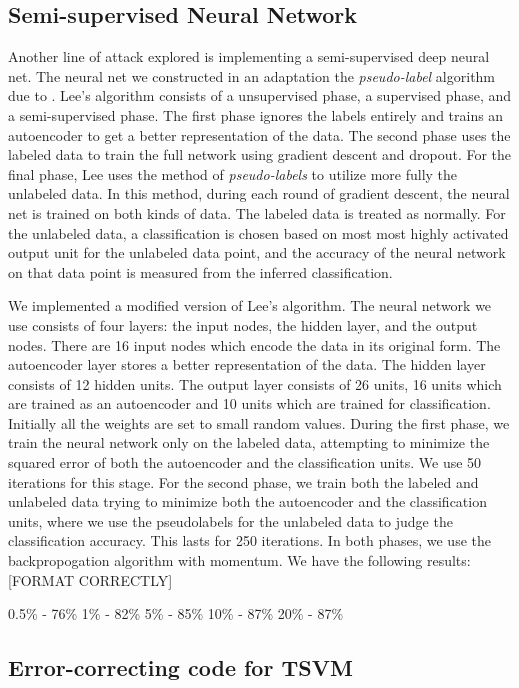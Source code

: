\documentclass[11pt]{article}
\begin{document}
\subsection{Semi-supervised Neural Network}

Another line of attack explored is implementing a semi-supervised deep neural net. The neural net we constructed in an adaptation the \emph{pseudo-label} algorithm due to \cite{Lee:2013}. Lee's algorithm consists of a unsupervised phase, a supervised phase, and a semi-supervised phase. The first phase ignores the labels entirely and trains an autoencoder to get a better representation of the data. The second phase uses the labeled data to train the full network using gradient descent and dropout. For the final phase, Lee uses the method of \emph{pseudo-labels} to utilize more fully the unlabeled data. In this method, during each round of gradient descent, the neural net is trained on both kinds of data. The labeled data is treated as normally. For the unlabeled data, a classification is chosen based on most most highly activated output unit for the unlabeled data point, and the accuracy of the neural network on that data point is measured from the inferred classification.

We implemented a modified version of Lee's algorithm. The neural network we use consists of four layers: the input nodes, the hidden layer, and the output nodes. There are 16 input nodes which encode the data in its original form. The autoencoder layer stores a better representation of the data. The hidden layer consists of 12 hidden units. The output layer consists of 26 units, 16 units which are trained as an autoencoder and 10 units which are trained for classification. Initially all the weights are set to small random values. During the first phase, we train the neural network only on the labeled data, attempting to minimize the squared error of both the autoencoder and the classification units. We use 50 iterations for this stage. For the second phase, we train both the labeled and unlabeled data trying to minimize both the autoencoder and the classification units, where we use the pseudolabels for the unlabeled data to judge the classification accuracy. This lasts for 250 iterations. In both phases, we use the backpropogation algorithm with momentum. We have the following results: [FORMAT CORRECTLY]

0.5\% - 76\%
1\% - 82\%
5\% - 85\%
10\% - 87\%
20\% - 87\%

\subsection{Error-correcting code for TSVM}
\end{document}
